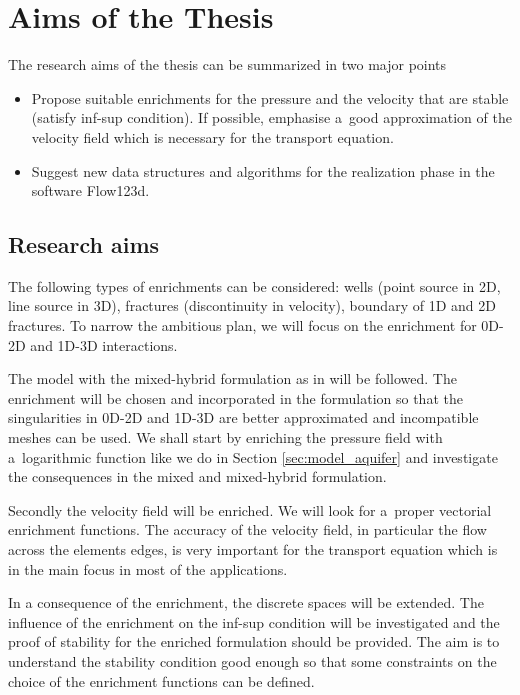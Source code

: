 \documentclass[FM,Dis]{tulthesis}
\begin{document}
\chapter{Aims of the Thesis}\label{chap:aims}


The research aims of the thesis can be summarized in two major points
\begin{itemize}
  \item Propose suitable enrichments for the pressure and the velocity that are stable (satisfy inf-sup condition). 
        If possible, emphasise a~good approximation of the velocity field which is necessary for the transport equation.
        
  \item Suggest new data structures and algorithms for the realization phase in the software Flow123d. 
\end{itemize}

\section{Research aims}

The following types of enrichments can be considered: wells (point source in 2D, line source in 3D), 
fractures (discontinuity in velocity), boundary of 1D and 2D fractures. 
To narrow the ambitious plan, we will focus on the enrichment for 0D-2D and 1D-3D interactions.

The model with the mixed-hybrid formulation as in \cite{brezina_mixed-hybrid_2010, sistek_bddc_2015} will be followed.
The enrichment will be chosen and incorporated in the formulation so that the singularities in 0D-2D and
1D-3D are better approximated and incompatible meshes can be used. 
We shall start by enriching the pressure field with a~logarithmic function like we
do in Section \ref{sec:model_aquifer} and investigate the consequences in the mixed and mixed-hybrid formulation.

Secondly the velocity field will be enriched. We will look for a~proper vectorial enrichment functions.
The accuracy of the velocity field, in particular the flow across the elements edges, is very important for
the transport equation which is in the main focus in most of the applications.

In a consequence of the enrichment, the discrete spaces will be extended. The influence of the enrichment on the inf-sup 
condition will be investigated and the proof of stability for the enriched formulation should be provided.
The aim is to understand the stability condition good enough so that some constraints on the choice of the enrichment 
functions can be defined. 
\end{document}
